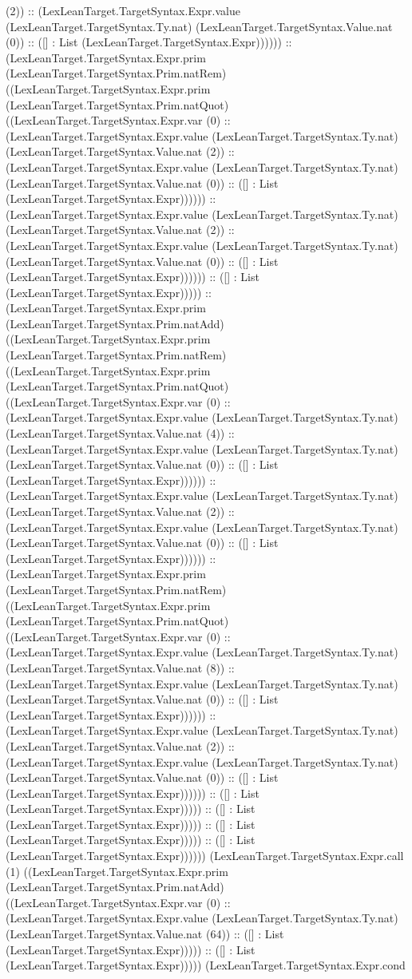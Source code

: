 \documentclass[11pt]{article}
\begin{document}
(2)) :: (LexLeanTarget.TargetSyntax.Expr.value (LexLeanTarget.TargetSyntax.Ty.nat) (LexLeanTarget.TargetSyntax.Value.nat (0)) :: ([] : List (LexLeanTarget.TargetSyntax.Expr)))))) :: (LexLeanTarget.TargetSyntax.Expr.prim (LexLeanTarget.TargetSyntax.Prim.natRem) ((LexLeanTarget.TargetSyntax.Expr.prim (LexLeanTarget.TargetSyntax.Prim.natQuot) ((LexLeanTarget.TargetSyntax.Expr.var (0) :: (LexLeanTarget.TargetSyntax.Expr.value (LexLeanTarget.TargetSyntax.Ty.nat) (LexLeanTarget.TargetSyntax.Value.nat (2)) :: (LexLeanTarget.TargetSyntax.Expr.value (LexLeanTarget.TargetSyntax.Ty.nat) (LexLeanTarget.TargetSyntax.Value.nat (0)) :: ([] : List (LexLeanTarget.TargetSyntax.Expr)))))) :: (LexLeanTarget.TargetSyntax.Expr.value (LexLeanTarget.TargetSyntax.Ty.nat) (LexLeanTarget.TargetSyntax.Value.nat (2)) :: (LexLeanTarget.TargetSyntax.Expr.value (LexLeanTarget.TargetSyntax.Ty.nat) (LexLeanTarget.TargetSyntax.Value.nat (0)) :: ([] : List (LexLeanTarget.TargetSyntax.Expr)))))) :: ([] : List (LexLeanTarget.TargetSyntax.Expr))))) :: (LexLeanTarget.TargetSyntax.Expr.prim (LexLeanTarget.TargetSyntax.Prim.natAdd) ((LexLeanTarget.TargetSyntax.Expr.prim (LexLeanTarget.TargetSyntax.Prim.natRem) ((LexLeanTarget.TargetSyntax.Expr.prim (LexLeanTarget.TargetSyntax.Prim.natQuot) ((LexLeanTarget.TargetSyntax.Expr.var (0) :: (LexLeanTarget.TargetSyntax.Expr.value (LexLeanTarget.TargetSyntax.Ty.nat) (LexLeanTarget.TargetSyntax.Value.nat (4)) :: (LexLeanTarget.TargetSyntax.Expr.value (LexLeanTarget.TargetSyntax.Ty.nat) (LexLeanTarget.TargetSyntax.Value.nat (0)) :: ([] : List (LexLeanTarget.TargetSyntax.Expr)))))) :: (LexLeanTarget.TargetSyntax.Expr.value (LexLeanTarget.TargetSyntax.Ty.nat) (LexLeanTarget.TargetSyntax.Value.nat (2)) :: (LexLeanTarget.TargetSyntax.Expr.value (LexLeanTarget.TargetSyntax.Ty.nat) (LexLeanTarget.TargetSyntax.Value.nat (0)) :: ([] : List (LexLeanTarget.TargetSyntax.Expr)))))) :: (LexLeanTarget.TargetSyntax.Expr.prim (LexLeanTarget.TargetSyntax.Prim.natRem) ((LexLeanTarget.TargetSyntax.Expr.prim (LexLeanTarget.TargetSyntax.Prim.natQuot) ((LexLeanTarget.TargetSyntax.Expr.var (0) :: (LexLeanTarget.TargetSyntax.Expr.value (LexLeanTarget.TargetSyntax.Ty.nat) (LexLeanTarget.TargetSyntax.Value.nat (8)) :: (LexLeanTarget.TargetSyntax.Expr.value (LexLeanTarget.TargetSyntax.Ty.nat) (LexLeanTarget.TargetSyntax.Value.nat (0)) :: ([] : List (LexLeanTarget.TargetSyntax.Expr)))))) :: (LexLeanTarget.TargetSyntax.Expr.value (LexLeanTarget.TargetSyntax.Ty.nat) (LexLeanTarget.TargetSyntax.Value.nat (2)) :: (LexLeanTarget.TargetSyntax.Expr.value (LexLeanTarget.TargetSyntax.Ty.nat) (LexLeanTarget.TargetSyntax.Value.nat (0)) :: ([] : List (LexLeanTarget.TargetSyntax.Expr)))))) :: ([] : List (LexLeanTarget.TargetSyntax.Expr))))) :: ([] : List (LexLeanTarget.TargetSyntax.Expr))))) :: ([] : List (LexLeanTarget.TargetSyntax.Expr))))) :: ([] : List (LexLeanTarget.TargetSyntax.Expr)))))) (LexLeanTarget.TargetSyntax.Expr.call (1) ((LexLeanTarget.TargetSyntax.Expr.prim (LexLeanTarget.TargetSyntax.Prim.natAdd) ((LexLeanTarget.TargetSyntax.Expr.var (0) :: (LexLeanTarget.TargetSyntax.Expr.value (LexLeanTarget.TargetSyntax.Ty.nat) (LexLeanTarget.TargetSyntax.Value.nat (64)) :: ([] : List (LexLeanTarget.TargetSyntax.Expr))))) :: ([] : List (LexLeanTarget.TargetSyntax.Expr))))) (LexLeanTarget.TargetSyntax.Expr.cond 
\end{document}
